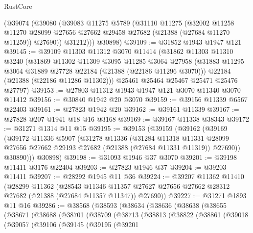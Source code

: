\begin{lexlean}{RustCore}
\begin{coremodule}
      (@39074
        (@39080
          (@39083
            @11275
            @5789
            (@31110
              @11275
              (@32002
                @11258
                @11270
                @28099
                @27656
                @27662
                @29458
                @27682
                (@21388 (@27684 @11270 @11259))
                @27690))
            @31212)))
      @30898)
@39109 := @31852 @1943 @1947 @121
@39145 := @39109
    @11303
    @11312
    @3070
    @11414
    (@31862
      @11303
      @11310
      @3240
      (@31869
        @11302
        @11309
        @3095
        @11285
        @3064
        @27958
        (@31883 @11295 @3064 @31889 @27728 @22184 (@21388 (@22186 @11296 @3070)))
        @22184
        (@21388 (@22186 @11286 @11302)))
      @25461
      @25464
      @25467
      @25471
      @25476
      @27797)
@39153 := @27803 @11312 @1943 @1947 @121 @3070 @11340 @3070 @11412
@39156 := @30840 @1942 @20 @3070
@39159 := @39156 @11339 @6567 @22403
@39161 := @27823 @1942 @20
@39162 := @39161 @11339
@39167 := @27828 @207 @1941 @18 @16 @3168
@39169 := @39167 @11338 @38343
@39172 := @31271 @1314 @11 @15
@39195 := @39153
    (@39159
      (@39162
        (@39169
          (@39172
            @11336
            @5907
            (@31278
              @11336
              (@31284
                @11318
                @11331
                @28099
                @27656
                @27662
                @29193
                @27682
                (@21388 (@27684 @11331 @11319))
                @27690))
            @30890)))
      @30898)
@39198 := @31093 @1946 @37 @3070
@39201 := @39198 @11411 @3176 @22404
@39203 := @27823 @1946 @37
@39204 := @39203 @11411
@39207 := @28292 @1945 @11 @36
@39224 := @39207
    @11362
    @11410
    (@28299
      @11362
      (@28543
        @11346
        @11357
        @27627
        @27656
        @27662
        @28312
        @27682
        (@21388 (@27684 @11357 @11347))
        @27690))
@39227 := @31271 @1893 @11 @16
@39286 := @38568
    (@38593
      (@38634
        (@38636
          (@38638
            (@38655
              (@38671
                (@38688
                  (@38701
                    (@38709
                      (@38713
                        (@38813
                          (@38822
                            (@38861
                              (@39018
                                (@39057
                                  (@39106
                                    (@39145
                                      (@39195
                                        (@39201

\end{coremodule}
\end{lexlean}
